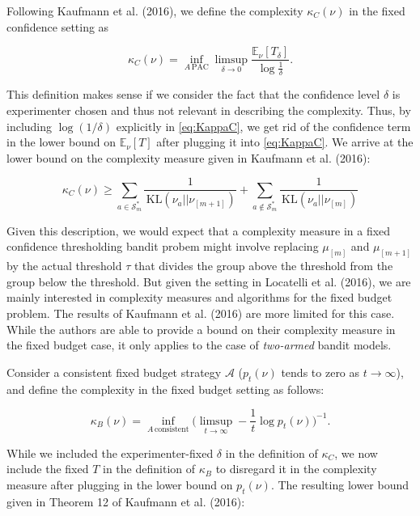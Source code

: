 \documentclass[11pt,]{article}
\newcommand{\KL}{\,\text{KL}}
\begin{document}
Following Kaufmann et al. (2016), we define the complexity
\(\kappa_C(\nu)\) in the fixed confidence setting as

\begin{equation}
\kappa_C(\nu) = \inf_{A \, \text{PAC}} \limsup_{\delta \to 0} \frac{\mathbb{E}_{\nu}[T_{\delta}]}{\log \frac{1}{\delta}}. \label{eq:KappaC}
\end{equation}

This definition makes sense if we consider the fact that the confidence
level \(\delta\) is experimenter chosen and thus not relevant in
describing the complexity. Thus, by including \(\log(1/\delta)\)
explicitly in \eqref{eq:KappaC}, we get rid of the confidence term in
the lower bound on \(\mathbb{E}_{\nu}[T]\) after plugging it into
\eqref{eq:KappaC}. We arrive at the lower bound on the complexity
measure given in Kaufmann et al. (2016):

\begin{equation*}
\kappa_C(\nu) \geq \sum_{a \in \mathcal{S}_m^*} \frac{1}{\KL(\nu_a || \nu_{[m+1]})} + \sum_{a \notin \mathcal{S}_m^*} \frac{1}{\KL(\nu_a || \nu_{[m]})}
\end{equation*}

Given this description, we would expect that a complexity measure in a
fixed confidence thresholding bandit probem might involve replacing
\(\mu_{[m]}\) and \(\mu_{[m+1]}\) by the actual threshold \(\tau\) that
divides the group above the threshold from the group below the
threshold. But given the setting in Locatelli et al. (2016), we are
mainly interested in complexity measures and algorithms for the fixed
budget problem. The results of Kaufmann et al. (2016) are more limited
for this case. While the authors are able to provide a bound on their
complexity measure in the fixed budget case, it only applies to the case
of \emph{two-armed} bandit models.

Consider a consistent fixed budget strategy \(\mathcal{A}\)
(\(p_t(\nu)\) tends to zero as \(t \rightarrow \infty\)), and define the
complexity in the fixed budget setting as follows:

\begin{equation}
\kappa_B(\nu) = \inf_{A \, \text{consistent}} \Big(\limsup_{t \to \infty} - \frac{1}{t} \log p_t(\nu)\Big)^{-1}.
\end{equation}

While we included the experimenter-fixed \(\delta\) in the definition of
\(\kappa_C\), we now include the fixed \(T\) in the definition of
\(\kappa_B\) to disregard it in the complexity measure after plugging in
the lower bound on \(p_t(\nu)\). The resulting lower bound given in
Theorem 12 of Kaufmann et al. (2016):
\end{document}
